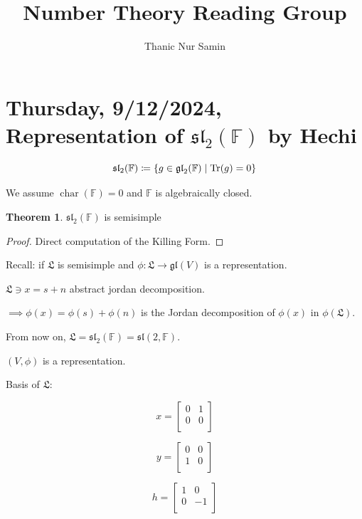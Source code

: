 \documentclass{article}
\title{Number Theory Reading Group}
\author{Thanic Nur Samin}
\date{\vspace{-5ex}}
\theoremstyle{definition}
\newtheorem{theorem}{Theorem}[section]
\newcommand{\Char}{\operatorname{char}}
\begin{document}
\maketitle

\tableofcontents

\section{Thursday, 9/12/2024, Representation of \(\mathfrak{sl}_2(\mathbb{F})\) by Hechi}

\[
    \mathfrak{sl}_2(\mathbb{F}) \coloneqq \{ g \in \mathfrak{gl}_2(\mathbb{F}) \mid \Tr(g) = 0 \}
\]

We assume \(\Char(\mathbb{F}) = 0\) and \(\mathbb{F}\) is algebraically closed.

\begin{theorem}
    \(\mathfrak{sl}_2(\mathbb{F})\) is semisimple
\end{theorem}

\begin{proof}
    Direct computation of the Killing Form.
\end{proof}

Recall: if \(\mathfrak{L}\) is semisimple and \(\phi: \mathfrak{L}  \to \mathfrak{gl}(V)\) is a representation.

\(\mathfrak{L} \ni x = s+n\) abstract jordan decomposition.

\(\implies \phi(x) = \phi(s) + \phi(n)\) is the Jordan decomposition of \(\phi(x)\) in \(\phi(\mathfrak{L})\).

From now on, \(\mathfrak{L} = \mathfrak{sl}_2(\mathbb{F}) = \mathfrak{sl}(2,\mathbb{F})\).

\((V,\phi)\) is a representation.

Basis of \(\mathfrak{L}\):

\[
    x = \begin{bmatrix}
        0 &  1 \\
        0 &  0 \\
    \end{bmatrix}
\]

\[
    y = \begin{bmatrix}
        0 &  0 \\
        1 &  0 \\
    \end{bmatrix}
\]

\[
    h = \begin{bmatrix}
        1 &  0 \\
        0 &  -1 \\
    \end{bmatrix}
\]
\end{document}
